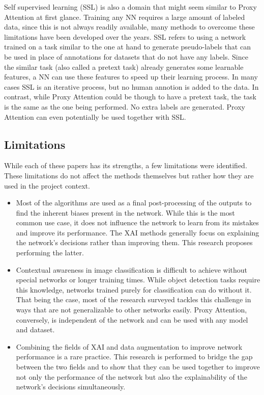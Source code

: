 Self supervised learning (SSL) is also a domain that might seem similar to Proxy Attention at first glance. Training any NN requires a large amount of labeled data, since this is not always readily available, many methods to overcome these limitations have been developed over the years. SSL refers to using a network trained on a task similar to the one at hand to generate pseudo-labels that can be used in place of annotations for datasets that do not have any labels. Since the similar task (also called a pretext task) already generates some learnable features, a NN can use these features to speed up their learning process. In many cases SSL is an iterative process, but no human annotion is added to the data. 
In contrast, while Proxy Attention could be though to have a pretext task, the task is the same as the one being performed. No extra labels are generated. Proxy Attention can even potentially be used together with SSL.

\subsection{Limitations}
While each of these papers has its strengths, a few limitations were identified. These limitations do not affect the methods themselves but rather how they are used in the project context.
\begin{itemize}
    \item Most of the algorithms are used as a final post-processing of the outputs to find the inherent biases present in the network. While this is the most common use case, it does not influence the network to learn from its mistakes and improve its performance. The XAI methods generally focus on explaining the network's decisions rather than improving them. This research proposes performing the latter.
    \item Contextual awareness in image classification is difficult to achieve without special networks or longer training times. While object detection tasks require this knowledge, networks trained purely for classification can do without it. That being the case, most of the research surveyed tackles this challenge in ways that are not generalizable to other networks easily. Proxy Attention, conversely, is independent of the network and can be used with any model and dataset. 
    \item Combining the fields of XAI and data augmentation to improve network performance is a rare practice. This research is performed to bridge the gap between the two fields and to show that they can be used together to improve not only the performance of the network but also the explainability of the network's decisions simultaneously.

\end{itemize}